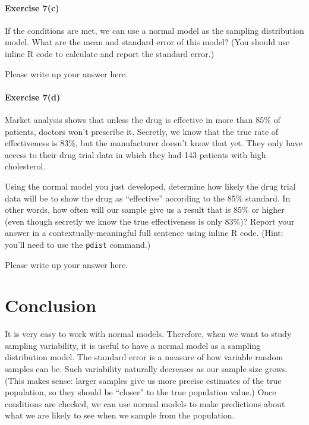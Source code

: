 \documentclass[
]{book}
\begin{document}
\hypertarget{exercise-7c-2}{%
\paragraph*{Exercise 7(c)}\label{exercise-7c-2}}

If the conditions are met, we can use a normal model as the sampling distribution model. What are the mean and standard error of this model? (You should use inline R code to calculate and report the standard error.)

Please write up your answer here.

\hypertarget{exercise-7d}{%
\paragraph*{Exercise 7(d)}\label{exercise-7d}}

Market analysis shows that unless the drug is effective in more than 85\% of patients, doctors won't prescribe it. Secretly, we know that the true rate of effectiveness is 83\%, but the manufacturer doesn't know that yet. They only have access to their drug trial data in which they had 143 patients with high cholesterol.

Using the normal model you just developed, determine how likely the drug trial data will be to show the drug as ``effective'' according to the 85\% standard. In other words, how often will our sample give us a result that is 85\% or higher (even though secretly we know the true effectiveness is only 83\%)? Report your answer in a contextually-meaningful full sentence using inline R code. (Hint: you'll need to use the \texttt{pdist} command.)

Please write up your answer here.

\hypertarget{samp-dist-models-conclusion}{%
\section{Conclusion}\label{samp-dist-models-conclusion}}

It is very easy to work with normal models. Therefore, when we want to study sampling variability, it is useful to have a normal model as a sampling distribution model. The standard error is a measure of how variable random samples can be. Such variability naturally decreases as our sample size grows. (This makes sense: larger samples give us more precise estimates of the true population, so they should be ``closer'' to the true population value.) Once conditions are checked, we can use normal models to make predictions about what we are likely to see when we sample from the population.
\end{document}
